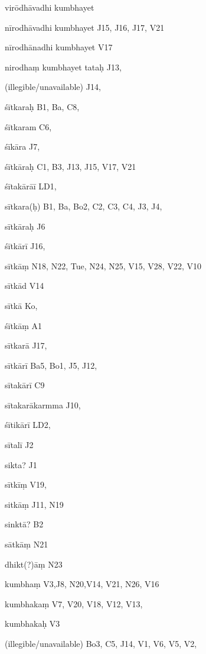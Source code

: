 \begin{ekdosis}
\begin{marma}[hp01_055]
\begin{marma}[hp02_009]
\begin{marma}[hp02_011]
\begin{marma}[hp02_49b]
\item[virōdhāvadhi kumbhayet]
\item[nīrodhāvadhi kumbhayet] J15, J16, J17, V21
\item[nīrodhānadhi kumbhayet] V17
\item[nirodhaṃ kumbhayet tataḥ] J13, 
\item[(illegible/unavailable)] J14,

 \begin{description}

        \end{description}
\end{marma}



\begin{marma}[hp02_54a]
\item[śītkaraḥ] B1, Ba, C8, 
\item[śītkaram] C6,
\item[śīkāra] J7,
\item[śītkāraḥ] C1, B3, J13, J15, V17, V21 
\item[śītakārāī] LD1, 
\item[sītkara(ḥ)] B1, Ba, Bo2, C2, C3, C4, J3, J4, 
\item[sītkāraḥ] J6
\item[śītkārī] J16, 
\item[sītkāṃ] N18, N22, Tue, N24, N25, V15, V28, V22, V10
\item[sītkād] V14
\item[sītkā] Ko,
\item[śītkāṃ] A1
\item[sītkarā] J17,
\item[sītkārī] Ba5, Bo1, J5, J12, 
\item[sītakārī] C9
\item[sītakarākarmma] J10, 
\item[śītikārī] LD2,
\item[sītalī] J2
\item[sikta?] J1
\item[sītkīṃ] V19,
\item[sitkāṃ] J11, N19
\item[sinktā?] B2
\item[sātkāṃ] N21
\item[dhikt(?)āṃ] N23
\item[kumbhaṃ] V3,J8, N20,V14, V21, N26, V16  
\item[kumbhakaṃ] V7, V20, V18, V12, V13, 
\item[kumbhakaḥ] V3
\item[]
\item[(illegible/unavailable)] Bo3, C5, J14, V1, V6, V5, V2, 
 \begin{description}


\end{description}
\end{marma}
\end{marma}
\end{marma}
\end{marma}
\end{ekdosis}

